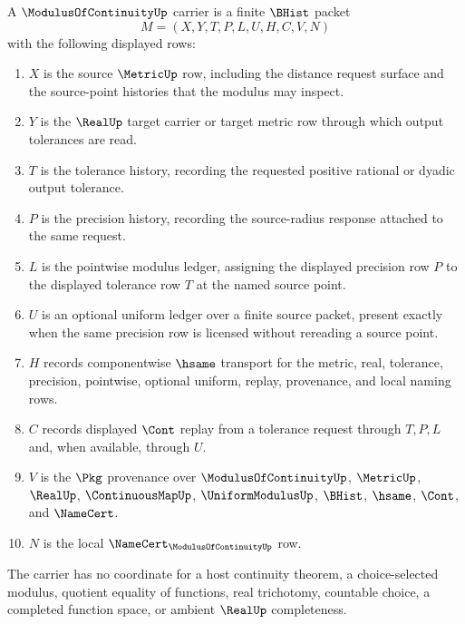 \begin{definition}
\label{def:modulus-of-continuity-carrier}
A $\ModulusOfContinuityUp$ carrier is a finite $\BHist$ packet
$$
M=(X,Y,T,P,L,U,H,C,V,N)
$$
with the following displayed rows:
\begin{enumerate}
\item $X$ is the source $\MetricUp$ row, including the distance request surface and the source-point histories that the modulus may inspect.
\item $Y$ is the $\RealUp$ target carrier or target metric row through which output tolerances are read.
\item $T$ is the tolerance history, recording the requested positive rational or dyadic output tolerance.
\item $P$ is the precision history, recording the source-radius response attached to the same request.
\item $L$ is the pointwise modulus ledger, assigning the displayed precision row $P$ to the displayed tolerance row $T$ at the named source point.
\item $U$ is an optional uniform ledger over a finite source packet, present exactly when the same precision row is licensed without rereading a source point.
\item $H$ records componentwise $\hsame$ transport for the metric, real, tolerance, precision, pointwise, optional uniform, replay, provenance, and local naming rows.
\item $C$ records displayed $\Cont$ replay from a tolerance request through $T,P,L$ and, when available, through $U$.
\item $V$ is the $\Pkg$ provenance over $\ModulusOfContinuityUp$, $\MetricUp$, $\RealUp$, $\ContinuousMapUp$, $\UniformModulusUp$, $\BHist$, $\hsame$, $\Cont$, and $\NameCert$.
\item $N$ is the local $\NameCert_{\ModulusOfContinuityUp}$ row.
\end{enumerate}
The carrier has no coordinate for a host continuity theorem, a choice-selected modulus, quotient equality of functions, real trichotomy, countable choice, a completed function space, or ambient $\RealUp$ completeness.
\end{definition}

